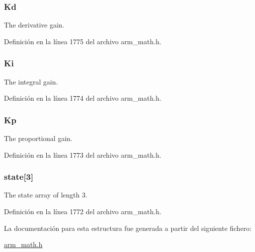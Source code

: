 \subsubsection[{\texorpdfstring{Kd}{Kd}}]{ Kd}\hypertarget{structarm__pid__instance__f32_ace6b9e405a991cbaf6b4c137ca0d51a3}{}\label{structarm__pid__instance__f32_ace6b9e405a991cbaf6b4c137ca0d51a3}
The derivative gain. 

Definición en la línea 1775 del archivo arm\+\_\+math.\+h.

\subsubsection[{\texorpdfstring{Ki}{Ki}}]{ Ki}\hypertarget{structarm__pid__instance__f32_ad1a1aa1c10a2dca201a3422f82198777}{}\label{structarm__pid__instance__f32_ad1a1aa1c10a2dca201a3422f82198777}
The integral gain. 

Definición en la línea 1774 del archivo arm\+\_\+math.\+h.

\subsubsection[{\texorpdfstring{Kp}{Kp}}]{ Kp}\hypertarget{structarm__pid__instance__f32_abe23f3e122ef5f55398fcf77c793c425}{}\label{structarm__pid__instance__f32_abe23f3e122ef5f55398fcf77c793c425}
The proportional gain. 

Definición en la línea 1773 del archivo arm\+\_\+math.\+h.

\subsubsection[{\texorpdfstring{state}{state}}]{ state\mbox{[}3\mbox{]}}\hypertarget{structarm__pid__instance__f32_a473556ac6100fc188e77930d56f51062}{}\label{structarm__pid__instance__f32_a473556ac6100fc188e77930d56f51062}
The state array of length 3. 

Definición en la línea 1772 del archivo arm\+\_\+math.\+h.



La documentación para esta estructura fue generada a partir del siguiente fichero\+:\begin{DoxyCompactItemize}
\item 
\hyperlink{arm__math_8h}{arm\+\_\+math.\+h}\end{DoxyCompactItemize}
